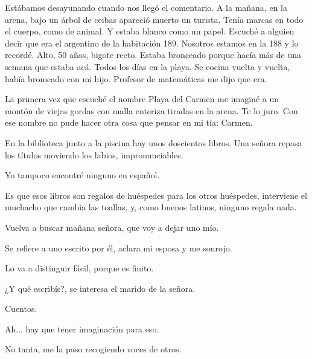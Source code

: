 \documentclass[12pt,twoside,openright,a5paper]{book}
\begin{document}
Estábamos desayunando cuando nos llegó el comentario. A la mañana, en la
arena, bajo un árbol de ceibas apareció muerto un turista. Tenía marcas
en todo el cuerpo, como de animal. Y estaba blanco como un papel. Escuché
a alguien decir que era el argentino de la habitación 189. Nosotros estamos
en la 188 y lo recordé. Alto, 50 años, bigote recto. Estaba bronceado
porque hacía más de una semana que estaba acá. Todos los días en la
playa. Se cocina vuelta y vuelta, había bromeado con mi hijo. Profesor de
matemáticas me dijo que era.


\vspace{0.5cm}
\hrulefill\hspace{0.2cm} \decofourleft\decofourright \hspace{0.2cm} \hrulefill
\vspace{0.5cm}

La primera vez que escuché el nombre Playa del Carmen me imaginé a un
montón de viejas gordas con malla enteriza tiradas en la arena. Te lo
juro. Con ese nombre no pude hacer otra cosa que pensar en mi tía: Carmen.


\vspace{0.5cm}
\hrulefill\hspace{0.2cm} \decofourleft\decofourright \hspace{0.2cm} \hrulefill
\vspace{0.5cm}

En la biblioteca junto a la piscina hay unos doscientos libros.  Una señora
repasa los títulos moviendo los labios, impronunciables.

Yo tampoco encontré ninguno en español.

Es que esos libros son regalos de huéspedes para los otros huéspedes,
interviene el muchacho que cambia las toallas, y, como buenos latinos, ninguno
regala nada.

Vuelva a buscar mañana señora, que voy a dejar uno mío.

Se refiere a uno escrito por él, aclara mi esposa y me sonrojo.

Lo va a distinguir fácil, porque es finito.

¿Y qué escribís?, se interesa el marido de la señora.

Cuentos.

Ah... hay que tener imaginación para eso.

No tanta, me la paso recogiendo voces de otros.


\vspace{0.5cm}
\hrulefill\hspace{0.2cm} \decofourleft\decofourright \hspace{0.2cm} \hrulefill
\vspace{0.5cm}
\end{document}

